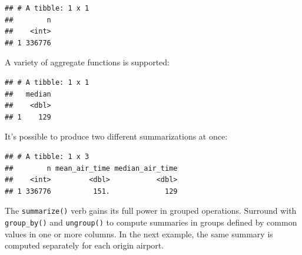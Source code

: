 \documentclass[]{book}
\newenvironment{Shaded}{}{}
\newcommand{\DataTypeTok}[1]{#1}
\newcommand{\KeywordTok}[1]{\textcolor[rgb]{0.00,0.00,1.00}{#1}}
\newcommand{\NormalTok}[1]{#1}
\newcommand{\OperatorTok}[1]{#1}
\newcommand{\OtherTok}[1]{\textcolor[rgb]{1.00,0.25,0.00}{#1}}
\newcommand{\StringTok}[1]{\textcolor[rgb]{0.00,0.50,0.50}{#1}}
\begin{document}
\begin{Shaded}
\end{Shaded}

\begin{verbatim}
## # A tibble: 1 x 1
##        n
##    <int>
## 1 336776
\end{verbatim}

A variety of aggregate functions is supported:

\begin{Shaded}
\end{Shaded}

\begin{verbatim}
## # A tibble: 1 x 1
##   median
##    <dbl>
## 1    129
\end{verbatim}

It's possible to produce two different summarizations at once:

\begin{Shaded}
\end{Shaded}

\begin{verbatim}
## # A tibble: 1 x 3
##        n mean_air_time median_air_time
##    <int>         <dbl>           <dbl>
## 1 336776          151.             129
\end{verbatim}

The \texttt{summarize()} verb gains its full power in grouped operations.
Surround with \texttt{group\_by()} and \texttt{ungroup()} to compute summaries in groups defined by common values in one or more columns.
In the next example, the same summary is computed separately for each origin airport.
\end{document}
